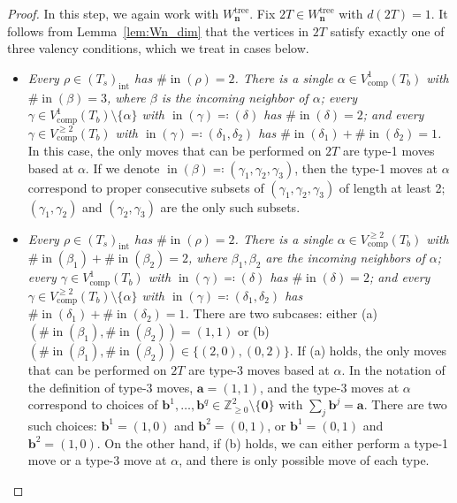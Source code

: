 \documentclass[11pt]{amsart}
\theoremstyle{definition}
\theoremstyle{remark}
\theoremstyle{plain}
\newcommand{\bZ}{\mathbb{Z}}
\newcommand\ba{\mathbf{a}}
\newcommand\bb{\mathbf{b}}
\newcommand\bn{\mathbf{n}}
\newcommand\bzero{\mathbf{0}}
\newcommand{\on}{\operatorname}
\newcommand{\comp}{C^2}
\renewcommand{\comp}{{\on{comp}}}
\newcommand{\incom}{\on{in}}
\newcommand{\inte}{{\on{int}}}
\newcommand{\tree}{{\on{tree}}}
\begin{document}
\begin{proof}
\noindent In this step, we again work with $W_\bn^\tree$.
Fix $2T \in W_\bn^\tree$ with $d(2T) = 1$.
It follows from Lemma~\ref{lem:Wn_dim} that the vertices in $2T$ satisfy exactly one of three valency conditions, which we treat in cases below.
\begin{itemize}
\item[] {\it Every $\rho \in (T_s)_\inte$ has $\#\!\incom(\rho) = 2$.
There is a single $\alpha \in V_\comp^1(T_b)$ with $\#\!\incom(\beta) = 3$, where $\beta$ is the incoming neighbor of $\alpha$; every $\gamma \in V_\comp^1(T_b) \setminus \{\alpha\}$ with $\incom(\gamma) \eqqcolon (\delta)$ has $\#\!\incom(\delta) = 2$; and every $\gamma \in V_\comp^{\geq2}(T_b)$ with $\incom(\gamma) \eqqcolon (\delta_1,\delta_2)$ has $\#\!\incom(\delta_1)+\#\!\incom(\delta_2) = 1$.} In this case, the only moves that can be performed on $2T$ are type-1 moves based at $\alpha$.
If we denote $\incom(\beta) \eqqcolon (\gamma_1,\gamma_2,\gamma_3)$, then the type-1 moves at $\alpha$ correspond to proper consecutive subsets of $(\gamma_1,\gamma_2,\gamma_3)$ of length at least 2; $(\gamma_1,\gamma_2)$ and $(\gamma_2,\gamma_3)$ are the only such subsets.

\medskip

\item[] {\it Every $\rho \in (T_s)_\inte$ has $\#\!\incom(\rho) = 2$.
There is a single $\alpha \in V_\comp^{\geq2}(T_b)$ with $\#\!\incom(\beta_1)+\#\!\incom(\beta_2) = 2$, where $\beta_1,\beta_2$ are the incoming neighbors of $\alpha$; every $\gamma \in V_\comp^1(T_b)$ with $\incom(\gamma) \eqqcolon (\delta)$ has $\#\!\incom(\delta) = 2$; and every $\gamma \in V_\comp^{\geq2}(T_b) \setminus \{\alpha\}$ with $\incom(\gamma) \eqqcolon (\delta_1,\delta_2)$ has $\#\!\incom(\delta_1)+\#\!\incom(\delta_2) = 1$.} There are two subcases: either (a) $(\#\!\incom(\beta_1),\#\!\incom(\beta_2))=(1,1)$ or (b) $(\#\!\incom(\beta_1),\#\!\incom(\beta_2)) \in \{(2,0),(0,2)\}$.
If (a) holds, the only moves that can be performed on $2T$ are type-3 moves based at $\alpha$.
In the notation of the definition of type-3 moves, $\ba=(1,1)$, and the type-3 moves at $\alpha$ correspond to choices of $\bb^1, \ldots, \bb^q \in \bZ_{\geq0}^2\setminus\{\bzero\}$ with $\sum_j \bb^j = \ba$.
There are two such choices: $\bb^1 = (1,0)$ and $\bb^2 = (0,1)$, or $\bb^1 = (0,1)$ and $\bb^2 = (1,0)$.
On the other hand, if (b) holds, we can either perform a type-1 move or a type-3 move at $\alpha$, and there is only possible move of each type.

\medskip


\end{itemize}
\end{proof}
\end{document}
